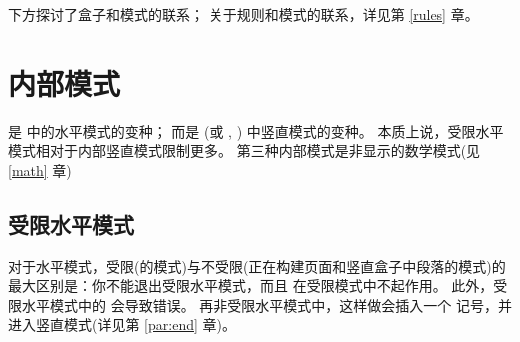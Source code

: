 \documentclass{book}
\begin{document}
下方探讨了盒子和模式的联系；
关于规则和模式的联系，详见第 \ref{rules} 章。

\section{内部模式}

是  中的水平模式的变种；
而是  (或 , ) 中竖直模式的变种。
本质上说，受限水平模式相对于内部竖直模式限制更多。
第三种内部模式是非显示的数学模式(见 \ref{math} 章)

\subsection{受限水平模式}

对于水平模式，受限(的模式)与不受限(正在构建页面和竖直盒子中段落的模式)的最大区别是：你不能退出受限水平模式，而且  在受限模式中不起作用。
此外，受限水平模式中的  会导致错误。
再非受限水平模式中，这样做会插入一个  记号，并进入竖直模式(详见第 \ref{par:end} 章)。
\end{document}
